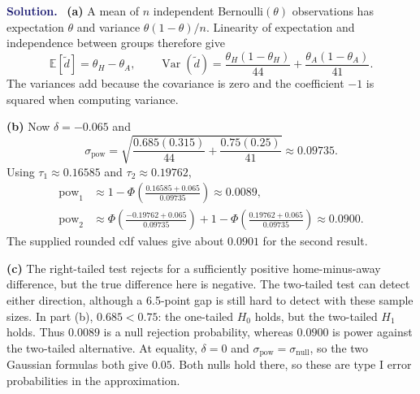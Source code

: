 \documentclass[11pt]{article}
\newcommand{\rv}[1]{\widetilde{#1}}
\newcommand{\E}{\mathbb E}
\newcommand{\Var}{\operatorname{Var}}
\newcommand{\pow}{\operatorname{pow}}
\newenvironment{answer}{\par\medskip\noindent\textcolor{MidnightBlue}{\textbf{Solution.}}\ }{\par\medskip}
\begin{document}
\begin{answer}
\textbf{(a)} A mean of $n$ independent Bernoulli$(\theta)$ observations
has expectation $\theta$ and variance $\theta(1-\theta)/n$.
Linearity of expectation and independence between groups therefore give
\[
 \E[\rv d]=\theta_H-\theta_A,\qquad
 \Var(\rv d)=\frac{\theta_H(1-\theta_H)}{44}
                         +\frac{\theta_A(1-\theta_A)}{41}.
\]
The variances add because the covariance is zero and the coefficient
$-1$ is squared when computing variance.

\textbf{(b)} Now $\delta=-0.065$ and
\[
 \sigma_{\mathrm{pow}}=
 \sqrt{\frac{0.685(0.315)}{44}+\frac{0.75(0.25)}{41}}
 \approx0.09735.
\]
Using $\tau_1\approx0.16585$ and $\tau_2\approx0.19762$,
\begin{align*}
 \pow_1&\approx1-\Phi\!\left(\frac{0.16585+0.065}{0.09735}\right)
       \approx\boxed{0.0089},\\
 \pow_2&\approx\Phi\!\left(\frac{-0.19762+0.065}{0.09735}\right)
       +1-\Phi\!\left(\frac{0.19762+0.065}{0.09735}\right)
       \approx\boxed{0.0900}.
\end{align*}
The supplied rounded cdf values give about $0.0901$ for the second result.

\textbf{(c)} The right-tailed test rejects for a sufficiently positive
home-minus-away difference, but the true difference here is negative.
The two-tailed test can detect either direction, although a 6.5-point gap
is still hard to detect with these sample sizes. In part (b),
$0.685<0.75$: the one-tailed $H_0$ holds, but the two-tailed $H_1$ holds.
Thus $0.0089$ is a null rejection probability, whereas $0.0900$ is power
against the two-tailed alternative.
At equality, $\delta=0$ and $\sigma_{\mathrm{pow}}=\sigma_{\mathrm{null}}$,
so the two Gaussian formulas both give $\boxed{0.05}$. Both nulls hold
there, so these are type I error probabilities in the approximation.
\end{answer}

\newpage
\end{document}
